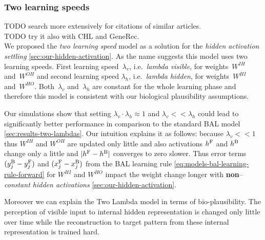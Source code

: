 
\subsubsection{Two learning speeds} 
\label{sec:our-two-lambdas}

TODO search more extensively for citations of similar articles. \\
TODO try it also with CHL and GeneRec.  \\ 

We proposed the \emph{two learning speed} model as a solution for the \emph{hidden activation settling} \ref{sec:our-hidden-activation}. As the name suggests this model uses two learning speeds. First learning speed~$\lambda_v$, i.e.~\emph{lambda visible}, for weights~$W^{IH}$ and~$W^{OH}$ and second learning speed $\lambda_h$, i.e.~\emph{lambda hidden}, for weights~$W^{HI}$ and~$W^{HO}$. Both~$\lambda_v$ and~$\lambda_h$ are constant for the whole learning phase and therefore this model is consistent with our biological plausibility assumptions. 

Our simulations show that setting $\lambda_v \cdot \lambda_h \approx 1$ and $\lambda_v << \lambda_h$ could lead to significantly better performance in comparison to the standard BAL model \ref{sec:results-two-lambdas}. Our intuition explains it as follows: because $\lambda_v << 1$ thus $W^{IH}$ and $W^{OH}$ are updated only little and also activations $h^{\rm F}$ and $h^{\rm B}$ change only a little and $|h^{\rm F}- h^{\rm B}|$ converges to zero slower. Thus error terms $(y_j^{\rm B} - y_j^{\rm F})$ and $(x_j^{\rm F} - x_j^{\rm B})$ from the BAL learning rule \ref{eq:models-bal-learning-rule-forward} for $W^{HI}$ and $W^{HO}$ impact the weight change longer with {\bf non}--\emph{constant hidden activations} \ref{sec:our-hidden-activation}. 

Moreover we can explain the Two Lambda model in terms of bio-plausibility. The perception of visible input to internal hidden representation is changed only little over time while the reconstruction to target pattern from these internal representation is trained hard. 

